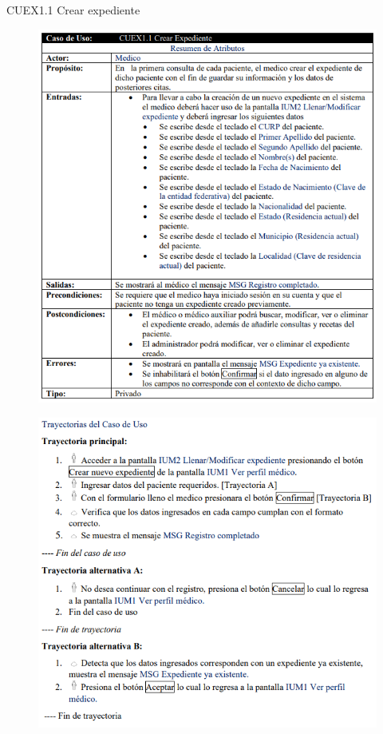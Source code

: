 \documentclass[12pt,letterpaper]{article}
\begin{document}
            \newpage
            CUEX1.1 Crear expediente
            \begin{figure}[H]
                \centering
                \includegraphics [scale=0.8]{specs/specCrearExpediente}
            \end{figure}
            \begin{figure}[H]
                \centering
                \includegraphics [scale=0.9]{specs/trayCrearExpediente}
            \end{figure}
\end{document}
